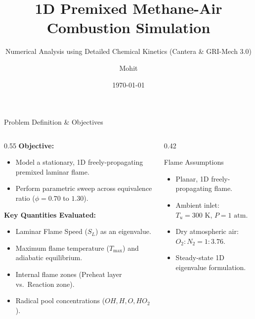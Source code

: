 \documentclass[aspectratio=169, 10pt]{beamer}
\title[1D Premixed Flame Simulation]{1D Premixed Methane-Air Combustion Simulation}
\subtitle{Numerical Analysis using Detailed Chemical Kinetics (Cantera \& GRI-Mech 3.0)}
\author{Mohit}
\institute[Dept. of Thermal Engg.]{Department of Mechanical / Thermal Engineering}
\date{\today}
\begin{document}
\begin{frame}
  \titlepage
\end{frame}

\begin{frame}{Problem Definition \& Objectives}
\begin{columns}[T]
  \begin{column}{0.55\textwidth}
    \textbf{Objective:}
    \begin{itemize}
      \item Model a stationary, 1D freely-propagating premixed laminar flame.
      \item Perform parametric sweep across equivalence ratio ($\phi = 0.70$ to $1.30$).
    \end{itemize}
    \vspace{0.8em}
    \textbf{Key Quantities Evaluated:}
    \begin{itemize}
      \item Laminar Flame Speed ($S_L$) as an eigenvalue.
      \item Maximum flame temperature ($T_{\max}$) and adiabatic equilibrium.
      \item Internal flame zones (Preheat layer vs.\ Reaction zone).
      \item Radical pool concentrations ($OH, H, O, HO_2$).
    \end{itemize}
  \end{column}

  \begin{column}{0.42\textwidth}
    \begin{block}{Flame Assumptions}
      \begin{itemize}
        \item Planar, 1D freely-propagating flame.
        \item Ambient inlet: $T_u = 300\text{ K}$, $P = 1\text{ atm}$.
        \item Dry atmospheric air: $O_2 : N_2 = 1 : 3.76$.
        \item Steady-state 1D eigenvalue formulation.
      \end{itemize}
    \end{block}
  \end{column}
\end{columns}
\end{frame}
\end{document}
